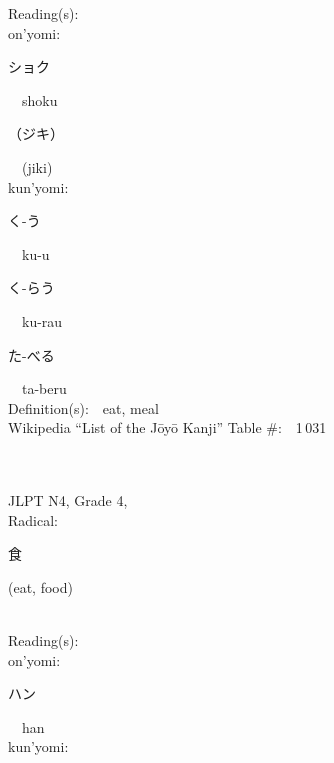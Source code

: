 \begin{multicols}{2}
Reading(s):\ \ \\
{\hspace*{1em}}on'yomi:\ \ \\
{\hspace*{2em}}{\begin{CJK}{UTF8}{min} ショク \end{CJK}}\ \ shoku\ \ \\
{\hspace*{2em}}{\begin{CJK}{UTF8}{min} （ジキ） \end{CJK}}\ \ (jiki)\ \ \\
{\hspace*{1em}}kun'yomi:\ \ \\
{\hspace*{2em}}{\begin{CJK}{UTF8}{min} く-う \end{CJK}}\ \ ku-u\ \ \\
{\hspace*{2em}}{\begin{CJK}{UTF8}{min} く-らう \end{CJK}}\ \ ku-rau\ \ \\
{\hspace*{2em}}{\begin{CJK}{UTF8}{min} た-べる \end{CJK}}\ \ ta-beru\ \ \\
Definition(s):\ \ eat, meal \\
Wikipedia ``List of the J\=oy\=o Kanji'' Table \#:\ \ 1\,031 \\
\ \ \\
{\fontsize{34pt}{40pt}  }\ \ \\  %
{JLPT N4, Grade 4, \\Radical:\ \ {\begin{CJK}{UTF8}{min} 食 \end{CJK}} (eat, food) } \\
Reading(s):\ \ \\
{\hspace*{1em}}on'yomi:\ \ \\
{\hspace*{2em}}{\begin{CJK}{UTF8}{min} ハン \end{CJK}}\ \ han\ \ \\
{\hspace*{1em}}kun'yomi:\ \ \\

\end{multicols}
